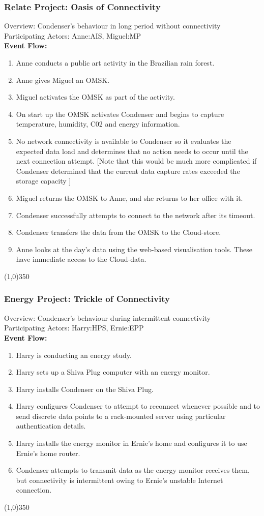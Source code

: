			\subsubsection{Relate Project: Oasis of Connectivity}
			Overview: Condenser's behaviour in long period without connectivity \\
			Participating Actors:  Anne:AIS, Miguel:MP \\
\textbf{Event Flow:}
	\begin{enumerate}
\item Anne conducts a public art activity in the Brazilian rain forest.
\item Anne gives Miguel an OMSK.
\item Miguel activates the OMSK as part of the activity.
\item On start up the OMSK activates Condenser and begins to capture temperature, humidity, C02 and energy information.
\item No network connectivity is available to Condenser so it evaluates the expected data load and determines that no action needs to occur until the next connection attempt. [Note that this would be much more complicated if Condenser determined that the current data capture rates exceeded the storage capacity ]
\item Miguel returns the OMSK to Anne, and she returns to her office with it.
\item Condenser successfully attempts to connect to the network after its timeout. 
\item Condenser transfers the data from the OMSK to the Cloud-store.
\item Anne looks at the day's data using the web-based visualisation tools. These have immediate access to the Cloud-data.
	\end{enumerate}
	\line(1,0){350}	
	\subsubsection{Energy Project: Trickle of Connectivity}
			Overview: Condenser's behaviour during intermittent connectivity \\
			Participating Actors:  Harry:HPS, Ernie:EPP \\
\textbf{Event Flow:}
	\begin{enumerate}
\item Harry is conducting an energy study.
\item Harry sets up a Shiva Plug computer with an energy monitor.
\item Harry installs Condenser on the Shiva Plug.
\item Harry configures Condenser to attempt to reconnect whenever possible and to send discrete data points to a rack-mounted server using particular authentication details. 
\item  Harry installs the energy monitor in Ernie's home and configures it to use Ernie's home router.
\item Condenser attempts to transmit data as the energy monitor receives them, but connectivity is intermittent owing to Ernie's unstable Internet connection.
	\end{enumerate}
	\line(1,0){350}